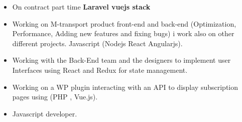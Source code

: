 \documentclass[10pt,a4paper,ragged2e]{altacv}
\begin{document}





\begin{fullwidth}


\begin{itemize}
\item On contract part time \textbf {Laravel vuejs stack}
\end{itemize}

\divider

\begin{itemize}
\item Working on M-transport product front-end and back-end (Optimization, Performance, Adding new features and fixing bugs) i work also on other different projects.
Javascript (Nodejs React Angularjs).
\end{itemize}

\divider

\begin{itemize}
\item Working with the Back-End team and the designers to implement user Interfaces using React and Redux for state management.
\end{itemize}

\divider

\begin{itemize}
\item Working on a WP plugin interacting with an API to display 
subscription pages using (PHP , Vue.js).

\end{itemize}

\divider

\begin{itemize}
\item Javascript developer.
\end{itemize}



\end{fullwidth}
\end{document}
